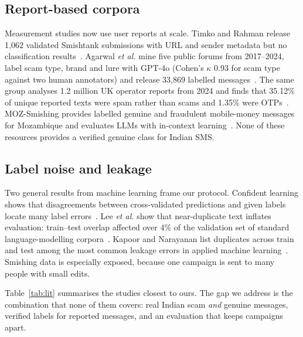 \documentclass[conference]{IEEEtran}
\begin{document}
\subsection{Report-based corpora}
Measurement studies now use user reports at scale. Timko and Rahman release 1,062 validated Smishtank submissions with URL and sender metadata but no classification results~\cite{timko2024smishing}. Agarwal \textit{et al.} mine five public forums from 2017--2024, label scam type, brand and lure with GPT-4o (Cohen's $\kappa$ 0.93 for scam type against two human annotators) and release 33,869 labelled messages~\cite{agarwal2025fishing}. The same group analyses 1.2 million UK operator reports from 2024 and finds that 35.12\% of unique reported texts were spam rather than scams and 1.35\% were OTPs~\cite{agarwal2026overview}. MOZ-Smishing provides labelled genuine and fraudulent mobile-money messages for Mozambique and evaluates LLMs with in-context learning~\cite{ali2025moz}. None of these resources provides a verified genuine class for Indian SMS.

\subsection{Label noise and leakage}
Two general results from machine learning frame our protocol. Confident learning shows that disagreements between cross-validated predictions and given labels locate many label errors~\cite{northcutt2021confident}. Lee \textit{et al.} show that near-duplicate text inflates evaluation: train--test overlap affected over 4\% of the validation set of standard language-modelling corpora~\cite{lee2022dedup}. Kapoor and Narayanan list duplicates across train and test among the most common leakage errors in applied machine learning~\cite{kapoor2023leakage}. Smishing data is especially exposed, because one campaign is sent to many people with small edits.

Table~\ref{tab:lit} summarises the studies closest to ours. The gap we address is the combination that none of them covers: real Indian scam \emph{and} genuine messages, verified labels for reported messages, and an evaluation that keeps campaigns apart.
\end{document}
